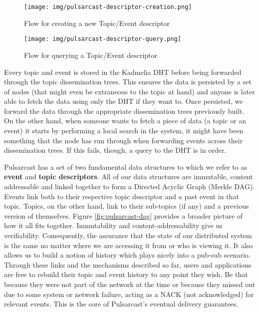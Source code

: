 \begin{figure}[hb!]
  \centering
  \texttt{[image: img/pulsarcast-descriptor-creation.png]}
  \caption{Flow for creating a new Topic/Event descriptor}
  \label{fig:pulsarcast-descriptor-creation}
\end{figure}

\begin{figure}[tb!]
  \centering
  \texttt{[image: img/pulsarcast-descriptor-query.png]}
  \caption{Flow for querying a Topic/Event descriptor}
  \label{fig:pulsarcast-descriptor-query}
\end{figure}

Every topic and event is stored in the Kadmelia DHT before being forwarded
through the topic dissemination trees. This ensures the data is persisted by a
set of nodes (that might even be extraneous to the topic at hand) and anyone is
later able to fetch the data using only the DHT if they want to. Once
persisted, we forward the data through the appropriate dissemination trees
previously built. On the other hand, when someone wants to fetch a piece of
data (a topic or an event) it starts by performing a local search in the
system, it might have been something that the node has run through when
forwarding events across their dissemination trees. If this fails, though, a
query to the DHT is in order.

Pulsarcast has a set of two fundamental data structures to which we refer to as
\textbf{event} and \textbf{topic descriptors}. All of our data structures are
immutable, content addressable and linked together to form a Directed Acyclic
Graph (Merkle DAG). Events link both to their respective topic descriptor and a
past event in that topic. Topics, on the other hand, link to their sub-topics
(if any) and a previous version of themselves. Figure \ref{fig:pulsarcast-dag}
provides a broader picture of how it all fits together. Immutability and
content-addressability give us verifiability. Consequently, the assurance that
the state of our distributed system is the same no matter where we are
accessing it from or who is viewing it. It also allows us to build a notion of
history which plays nicely into a pub-sub scenario. Through these links and the
mechanisms described so far, users and applications are free to rebuild their
topic and event history to any point they wish. Be that because they were not
part of the network at the time or because they missed out due to some system
or network failure, acting as a NACK (not acknowledged) for relevant events.
This is the core of Pulsarcast's eventual delivery guarantees.

